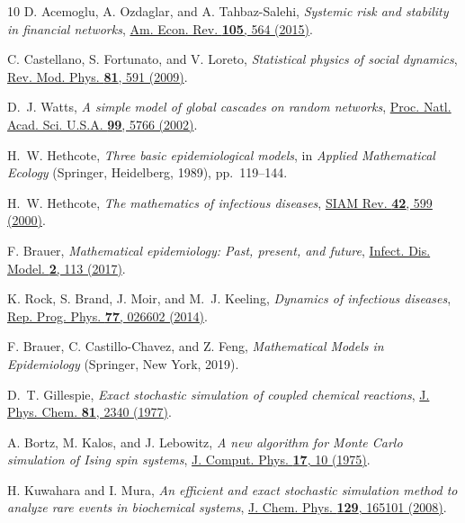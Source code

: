 \documentclass[english,10pt,aps,pra,twocolumn,superscriptaddress,floatfix,fleqn]{revtex4-2}
\begin{document}
\begin{thebibliography}{10}
D. Acemoglu, A. Ozdaglar, and A. Tahbaz-Salehi, {\em Systemic risk and
  stability in financial networks},
  \href{http://dx.doi.org/10.1257/aer.20130456} {Am. Econ. Rev. {\bf 105},  564
   (2015)}.

C. Castellano, S. Fortunato, and V. Loreto, {\em Statistical physics of social
  dynamics}, \href{http://dx.doi.org/10.1103/RevModPhys.81.591} {Rev. Mod.
  Phys. {\bf 81},  591  (2009)}.

D.~J. Watts, {\em A simple model of global cascades on random networks},
  \href{http://dx.doi.org/10.1073/pnas.082090499} {Proc. Natl. Acad. Sci.
  U.S.A. {\bf 99},  5766  (2002)}.

H.~W. Hethcote, {\em Three basic epidemiological models},  in {\em Applied
  Mathematical Ecology} (Springer, Heidelberg, 1989), pp.\ 119--144.

H.~W. Hethcote, {\em The mathematics of infectious diseases},
  \href{http://dx.doi.org/10.1137/S0036144500371907} {SIAM Rev. {\bf 42},  599
  (2000)}.

F. Brauer, {\em Mathematical epidemiology: Past, present, and future},
  \href{http://dx.doi.org/10.1016/j.idm.2017.02.001} {Infect. Dis. Model. {\bf
  2},  113  (2017)}.

K. Rock, S. Brand, J. Moir, and M.~J. Keeling, {\em Dynamics of infectious
  diseases}, \href{http://dx.doi.org/10.1088/0034-4885/77/2/026602} {Rep. Prog.
  Phys. {\bf 77},  026602  (2014)}.

F. Brauer, C. Castillo-Chavez, and Z. Feng, {\em Mathematical Models in
  Epidemiology} (Springer, New York, 2019).

D.~T. Gillespie, {\em Exact stochastic simulation of coupled chemical
  reactions}, \href{http://dx.doi.org/10.1021/j100540a008} {J. Phys. Chem. {\bf
  81},  2340  (1977)}.

A. Bortz, M. Kalos, and J. Lebowitz, {\em A new algorithm for Monte Carlo
  simulation of Ising spin systems},
  \href{http://dx.doi.org/10.1016/0021-9991(75)90060-1} {J. Comput. Phys. {\bf
  17},  10  (1975)}.

H. Kuwahara and I. Mura, {\em An efficient and exact stochastic simulation
  method to analyze rare events in biochemical systems},
  \href{http://dx.doi.org/10.1063/1.2987701} {J. Chem. Phys. {\bf 129},  165101
   (2008)}.


\end{thebibliography}
\end{document}
